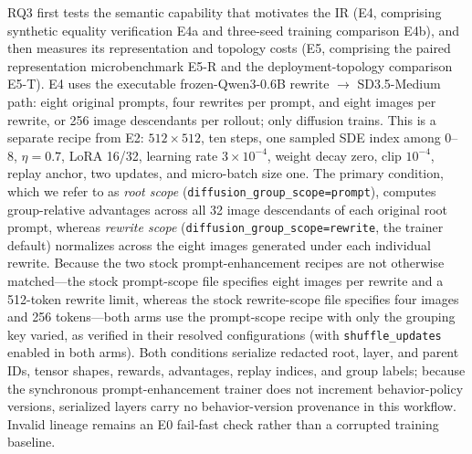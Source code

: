 \documentclass[10pt]{article}
\begin{document}
RQ3 first tests the semantic capability that motivates the IR (E4, comprising synthetic equality verification E4a and three-seed training comparison E4b), and then measures its representation and topology costs (E5, comprising the paired representation microbenchmark E5-R and the deployment-topology comparison E5-T).
E4 uses the executable frozen-Qwen3-0.6B rewrite $\rightarrow$ SD3.5-Medium path: eight original prompts, four rewrites per prompt, and eight images per rewrite, or 256 image descendants per rollout; only diffusion trains.
This is a separate recipe from E2: $512\times512$, ten steps, one sampled SDE index among 0--8, $\eta=0.7$, LoRA 16/32, learning rate $3\times10^{-4}$, weight decay zero, clip $10^{-4}$, replay anchor, two updates, and micro-batch size one.
The primary condition, which we refer to as \emph{root scope} (\texttt{diffusion\_group\_scope=prompt}), computes group-relative advantages across all 32 image descendants of each original root prompt, whereas \emph{rewrite scope} (\texttt{diffusion\_group\_scope=rewrite}, the trainer default) normalizes across the eight images generated under each individual rewrite.
Because the two stock prompt-enhancement recipes are not otherwise matched---the stock prompt-scope file specifies eight images per rewrite and a 512-token rewrite limit, whereas the stock rewrite-scope file specifies four images and 256 tokens---both arms use the prompt-scope recipe with only the grouping key varied, as verified in their resolved configurations (with \texttt{shuffle\_updates} enabled in both arms).
Both conditions serialize redacted root, layer, and parent IDs, tensor shapes, rewards, advantages, replay indices, and group labels; because the synchronous prompt-enhancement trainer does not increment behavior-policy versions, serialized layers carry no behavior-version provenance in this workflow.
Invalid lineage remains an E0 fail-fast check rather than a corrupted training baseline.
\end{document}
